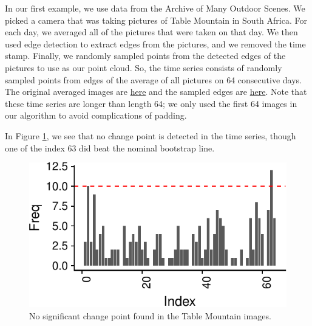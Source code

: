 \documentclass[smallextended]{svjour3}       %
\begin{document}
\begin{example} 
In our first example, we use data from the Archive of Many Outdoor Scenes. We picked a
camera that was taking pictures of Table Mountain in
South Africa. For each day, we averaged all of the pictures that were
taken on that day. We then used edge detection to extract edges from the
pictures, and we removed the time stamp. Finally, we randomly sampled
points from the detected edges of the pictures to use as our point
cloud. So, the time series consists of randomly sampled points from
edges of the average of all pictures on 64 consecutive days. The
original averaged images are
\href{http://stat.slu.edu/~speegle/Kaapstad.gif}{here} and the sampled
edges are \href{http://stat.slu.edu/~speegle/Slide4.gif}{here}. Note that these time series are longer than length 64; we only used the first 64 images in our algorithm to avoid complications of padding.

In Figure \ref{fig:9}, we see that no change point is detected in the time series, though one of the index 63 did beat the nominal bootstrap line. 

\begin{figure}[H]\includegraphics{springer_template_files/figure-latex/chunk_8-1} 
\caption{No significant change point found in the Table Mountain images.}
\label{fig:9}\end{figure}
\end{example}
\end{document}
